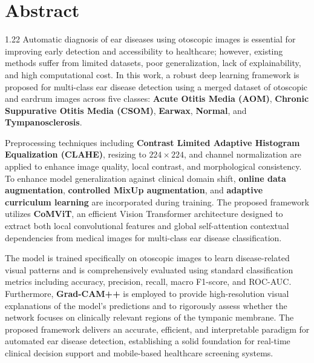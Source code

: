 \chapter*{Abstract}%
%
\vspace{-25pt}

\begin{spacing}{1.22}
\noindent Automatic diagnosis of ear diseases using otoscopic images is essential for improving early detection and accessibility to healthcare; however, existing methods suffer from limited datasets, poor generalization, lack of explainability, and high computational cost. In this work, a robust deep learning framework is proposed for multi-class ear disease detection using a merged dataset of otoscopic and eardrum images across five classes: \textbf{Acute Otitis Media (AOM)}, \textbf{Chronic Suppurative Otitis Media (CSOM)}, \textbf{Earwax}, \textbf{Normal}, and \textbf{Tympanosclerosis}.

\vspace{8pt}

\noindent Preprocessing techniques including \textbf{Contrast Limited Adaptive Histogram Equalization (CLAHE)}, resizing to $224 \times 224$, and channel normalization are applied to enhance image quality, local contrast, and morphological consistency. To enhance model generalization against clinical domain shift, \textbf{online data augmentation}, \textbf{controlled MixUp augmentation}, and \textbf{adaptive curriculum learning} are incorporated during training. The proposed framework utilizes \textbf{CoMViT}, an efficient Vision Transformer architecture designed to extract both local convolutional features and global self-attention contextual dependencies from medical images for multi-class ear disease classification.

\vspace{8pt}

\noindent The model is trained specifically on otoscopic images to learn disease-related visual patterns and is comprehensively evaluated using standard classification metrics including accuracy, precision, recall, macro F1-score, and ROC-AUC. Furthermore, \textbf{Grad-CAM++} is employed to provide high-resolution visual explanations of the model's predictions and to rigorously assess whether the network focuses on clinically relevant regions of the tympanic membrane. The proposed framework delivers an accurate, efficient, and interpretable paradigm for automated ear disease detection, establishing a solid foundation for real-time clinical decision support and mobile-based healthcare screening systems.
\end{spacing}

\thispagestyle{plain}
